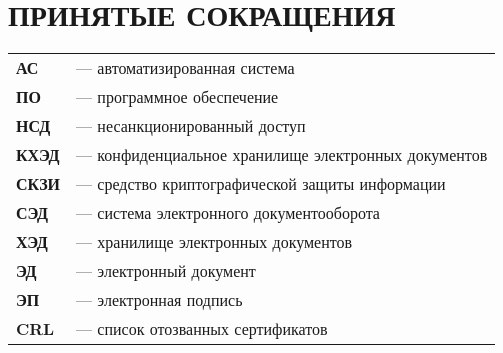 \chapter*{ПРИНЯТЫЕ СОКРАЩЕНИЯ}
\begin{tabular}{ll}

\textbf{АС} & --- автоматизированная система \\
\textbf{ПО} & --- программное обеспечение \\
\textbf{НСД} & --- несанкционированный доступ \\
\textbf{КХЭД} & --- конфиденциальное хранилище электронных документов \\
\textbf{СКЗИ} & --- средство криптографической защиты информации \\
\textbf{СЭД} & --- система электронного документооборота \\
\textbf{ХЭД} & --- хранилище электронных документов \\
\textbf{ЭД} & --- электронный документ \\
\textbf{ЭП} & --- электронная подпись \\
\textbf{CRL} & --- список отозванных сертификатов  \\
\end{tabular}
\clearpage